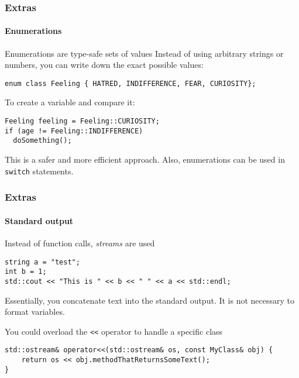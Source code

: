 \begin{frame}[fragile]
\frametitle{Extras}
\framesubtitle{Enumerations}

\begin{block}{Enumerations are type-safe sets of values}
Instead of using arbitrary strings or numbers, you can write down the exact possible values:

{\scriptsize 
\begin{verbatim}
enum class Feeling { HATRED, INDIFFERENCE, FEAR, CURIOSITY};
\end{verbatim}
}
\end{block}
\pause
\begin{block}{To create a variable and compare it:}

{\scriptsize 
\begin{verbatim}
Feeling feeling = Feeling::CURIOSITY;
if (age != Feeling::INDIFFERENCE)
  doSomething();
\end{verbatim}
}

This is a safer and more efficient approach. Also, enumerations can be used in \texttt{switch} statements.
\end{block}

\end{frame}

\begin{frame}[fragile]
\frametitle{Extras}
\framesubtitle{Standard output}

\begin{block}{Instead of function calls, {\em streams} are used}

{\scriptsize 
\begin{verbatim}
string a = "test";
int b = 1;
std::cout << "This is " << b << " " << a << std::endl;
\end{verbatim}
}

Essentially, you concatenate text into the standard output. It is not necessary to format variables.
\end{block}
\pause
\begin{block}{You could overload the \texttt{<\;\!\!<} operator to handle a specific class}
{\scriptsize 
\begin{verbatim}
std::ostream& operator<<(std::ostream& os, const MyClass& obj) {
    return os << obj.methodThatReturnsSomeText();
}
\end{verbatim}
}
\end{block}

\end{frame}


